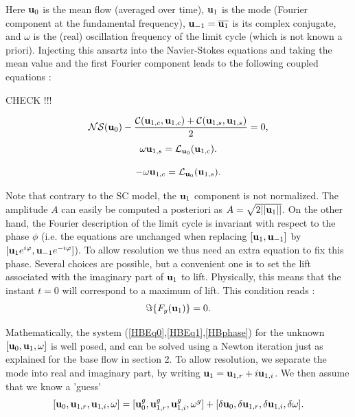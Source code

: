 \documentclass[twocolumn,10pt]{asme2ej}
\newcommand{\be}[1]{ \begin{equation} \label{#1}}
\newcommand{\ee}{\end{equation}}
\begin{document}
Here ${\bf u }_0$ is the mean flow (averaged over time),  ${\bf u }_1$ is the mode
(Fourier component at the fundamental frequency), ${\bf u }_{-1} = \overline{{\bf u }_1}$ is its complex conjugate, and $\omega$ is the (real) oscillation frequency of the limit cycle (which is not known a priori). Injecting this ansartz into the Navier-Stokes equations and taking the mean value and the first Fourier component leads to the following coupled equations :

CHECK !!!

\be{HBEq0}
{\cal NS}(  {\bf u }_0 ) - \frac{{\cal C}( {\bf u }_{1,c}, {\bf u }_{1,c}) +{\cal C}( {\bf u }_{1,s}, {\bf u }_{1,s})}{2}  = 0,
\ee
\be{HBEq1}
 \omega {\bf u }_{1,s} =  {\cal L}_{{\bf u }_0}(  {\bf u }_{1,c} ).
\ee


\be{HBEq1b}
 -\omega {\bf u }_{1,c} =  {\cal L}_{{\bf u }_0}(  {\bf u }_{1,s} ).
\ee


Note that contrary to the SC model, the ${\bf u }_1$ component is not normalized. The amplitude $A$ can easily be computed a posteriori as $A = \sqrt{2 ||{\bf u }_1||}$. On the other hand, the Fourier description of the limit cycle is invariant with respect to the phase $\phi$ (i.e. the equations are unchanged when replacing $[ {\bf u }_1,  {\bf u }_{-1}] $ by  $[ {\bf u }_1 e^{i\varphi},  {\bf u }_{-1}  e^{-i\varphi}] $). 
To allow resolution we thus need an extra equation to fix this phase. Several choices are possible, but a convenient one is to set the lift associated with the imaginary part of ${\bf u }_1$ to lift. Physically, this means that the instant $t=0$ will correspond to a maximum of lift. This condition reads :
\be{HBphase}
\Im \{F_y({\bf u}_1) \} =0.
\ee

Mathematically, the system (\ref{HBEq0},\ref{HBEq1},\ref{HBphase}) for the unknown $[{\bf u }_0, {\bf u }_{1}, \omega]$ is well posed, and can be solved using a Newton iteration just as explained for the base flow in section 2. To allow resolution, we separate the mode into real and imaginary part, by writing ${\bf u }_1 = {\bf u }_{1,r} +  i {\bf u }_{1,i} $.
We then assume that we know a 'guess' 
$$
[{\bf u }_0, {\bf u }_{1,r}, {\bf u }_{1,i}, \omega] = 
 [{\bf u }_0^g, {\bf u }_{1,r}^g, {\bf u }_{1,i}^g, \omega^g]
+ [\delta {\bf u }_0, \delta {\bf u }_{1,r}, \delta {\bf u }_{1,i}, \delta \omega].
$$
\end{document}
